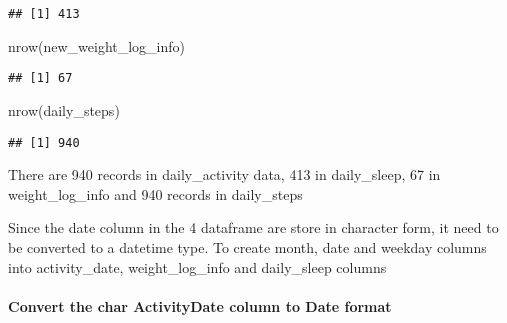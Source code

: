 \documentclass[
]{article}
\newenvironment{Shaded}{\begin{snugshade}}{\end{snugshade}}
\newcommand{\CommentTok}[1]{\textcolor[rgb]{0.56,0.35,0.01}{\textit{#1}}}
\newcommand{\FunctionTok}[1]{\textcolor[rgb]{0.00,0.00,0.00}{#1}}
\newcommand{\NormalTok}[1]{#1}
\newcommand{\OtherTok}[1]{\textcolor[rgb]{0.56,0.35,0.01}{#1}}
\newcommand{\SpecialCharTok}[1]{\textcolor[rgb]{0.00,0.00,0.00}{#1}}
\newcommand{\StringTok}[1]{\textcolor[rgb]{0.31,0.60,0.02}{#1}}
\begin{document}
\begin{verbatim}
## [1] 413
\end{verbatim}

\begin{Shaded}
\begin{Highlighting}[]
\FunctionTok{nrow}\NormalTok{(new\_weight\_log\_info)}
\end{Highlighting}
\end{Shaded}

\begin{verbatim}
## [1] 67
\end{verbatim}

\begin{Shaded}
\begin{Highlighting}[]
\FunctionTok{nrow}\NormalTok{(daily\_steps)}
\end{Highlighting}
\end{Shaded}

\begin{verbatim}
## [1] 940
\end{verbatim}

There are 940 records in daily\_activity data, 413 in daily\_sleep, 67
in weight\_log\_info and 940 records in daily\_steps

Since the date column in the 4 dataframe are store in character form, it
need to be converted to a datetime type. To create month, date and
weekday columns into activity\_date, weight\_log\_info and daily\_sleep
columns

\hypertarget{convert-the-char-activitydate-column-to-date-format}{%
\paragraph{Convert the char ActivityDate column to Date
format}\label{convert-the-char-activitydate-column-to-date-format}}

\begin{Shaded}
\end{Shaded}
\end{document}
